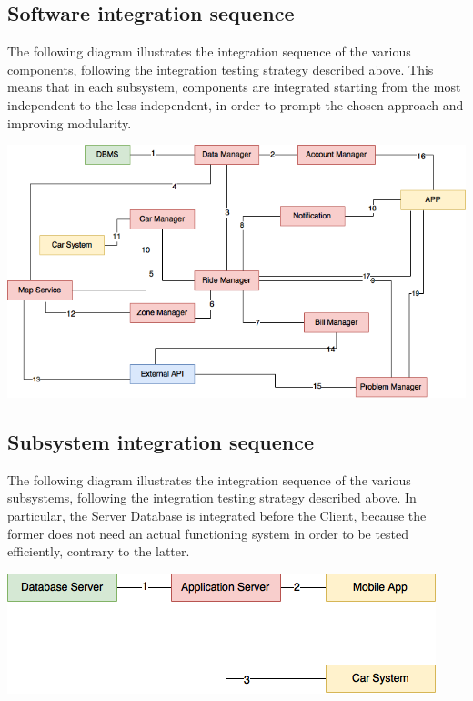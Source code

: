 \subsection{Software integration sequence}
The following diagram illustrates the integration sequence of the various components, following the integration testing strategy described above. This means that in each subsystem, components are integrated starting from the most independent to the less independent, in order to prompt the chosen approach and improving modularity. 
\begin{center}
	\includegraphics[width=\textwidth]{Diagrams/SoftwareIntegrationDiagram.png}
	\label{Software Integration Diagram}
\end{center}

\subsection{Subsystem integration sequence}
The following diagram illustrates the integration sequence of the various subsystems, following the integration testing strategy described above. In particular, the Server Database is integrated before the Client, because the former does not need an actual functioning system in order to be tested efficiently, contrary to the latter.
\begin{center}
	\includegraphics[width=\textwidth]{Diagrams/SubsystemsIntegrationDiagram.png}
	\label{Subsystem Integration Diagram}
\end{center}